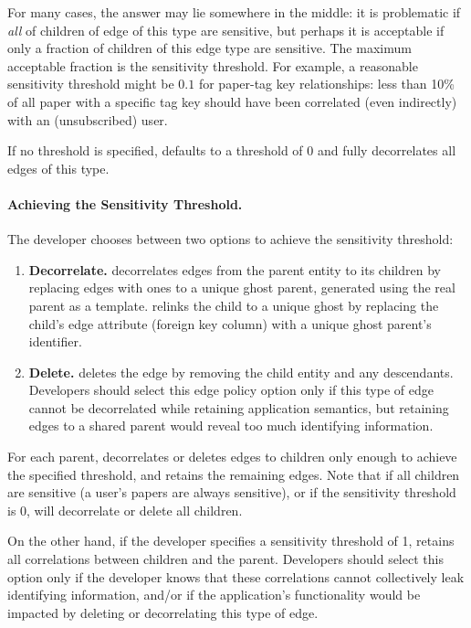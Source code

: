 For many cases, the answer may lie somewhere in the middle: it is problematic if \emph{all} of
children of edge of this type are sensitive, but perhaps it is acceptable if only a fraction of
children of this edge type are sensitive. The maximum acceptable fraction is the sensitivity
threshold. For example, a reasonable sensitivity threshold might be $0.1$ for paper-tag
key relationships: less than 10\% of all paper with a specific tag key should have been correlated
(even indirectly) with an (unsubscribed) user. 

If no threshold is specified, \proto defaults to a threshold of $0$ and fully
decorrelates all edges of this type. 

\paragraph{Achieving the Sensitivity Threshold.}
The developer chooses between two options to achieve the sensitivity threshold: 
\begin{enumerate}
    \item \textbf{Decorrelate.}
    \proto decorrelates edges from the parent entity to its children by 
    replacing edges with ones to a unique ghost parent, generated using the
    real parent as a template. \proto relinks the child to a unique ghost by replacing the child's edge
    attribute (foreign key column) with a unique ghost parent's identifier. 

\item \textbf{Delete.}
    \proto deletes the edge by removing the child entity and any descendants. Developers should select
    this edge policy option only if this type of edge cannot be decorrelated while retaining application
    semantics, but retaining edges to a shared parent would reveal too much identifying information.
\end{enumerate}

For each parent, \proto decorrelates or deletes edges to children only enough to achieve the specified
threshold, and retains the remaining edges. Note that if all children are sensitive (a user's papers
are always sensitive), or if the sensitivity threshold is 0, \proto will decorrelate or delete all
children. 

On the other hand, if the developer specifies a sensitivity threshold of 1, \proto retains all
correlations between children and the parent. Developers should select this option only if the
developer knows that these correlations cannot collectively leak identifying information, and/or if
the application's functionality would be impacted by deleting or decorrelating this type of edge.


